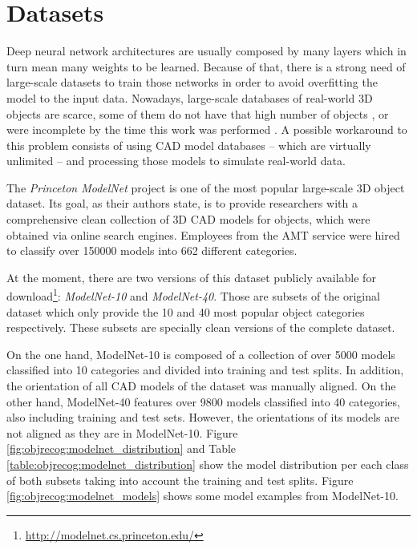 \section{Datasets}
\label{cha:objrecog:sec:datasets}

Deep neural network architectures are usually composed by many layers which in turn mean many weights to be learned. Because of that, there is a strong need of large-scale datasets to train those networks in order to avoid overfitting the model to the input data. Nowadays, large-scale databases of real-world \acs{3D} objects are scarce, some of them do not have that high number of objects \cite{Lai2011}\cite{Singh2014}\cite{Li2014}, or were incomplete by the time this work was performed \cite{Choi2016}. A possible workaround to this problem consists of using \ac{CAD} model databases -- which are virtually unlimited -- and processing those models to simulate real-world data.

The \emph{Princeton ModelNet} project is one of the most popular large-scale \acs{3D} object dataset. Its goal, as their authors state, is to provide researchers with a comprehensive clean collection of \acs{3D} \ac{CAD} models for objects, which were obtained via online search engines. Employees from the \ac{AMT} service were hired to classify over \num{150000} models into \num{662} different categories.

At the moment, there are two versions of this dataset publicly available for download\footnote{\url{http://modelnet.cs.princeton.edu/}}: \emph{ModelNet-10} and \emph{ModelNet-40}. Those are subsets of the original dataset which only provide the \num{10} and \num{40} most popular object categories respectively. These subsets are specially clean versions of the complete dataset.

On the one hand, ModelNet-10 is composed of a collection of over 5000 models classified into 10 categories and divided into training and test splits. In addition, the orientation of all \ac{CAD} models of the dataset was manually aligned. On the other hand, ModelNet-40 features over \num{9800} models classified into \num{40} categories, also including training and test sets. However, the orientations of its models are not aligned as they are in ModelNet-10. Figure \ref{fig:objrecog:modelnet_distribution} and Table \ref{table:objrecog:modelnet_distribution} show the model distribution per each class of both subsets taking into account the training and test splits. Figure \ref{fig:objrecog:modelnet_models} shows some model examples from ModelNet-10.

